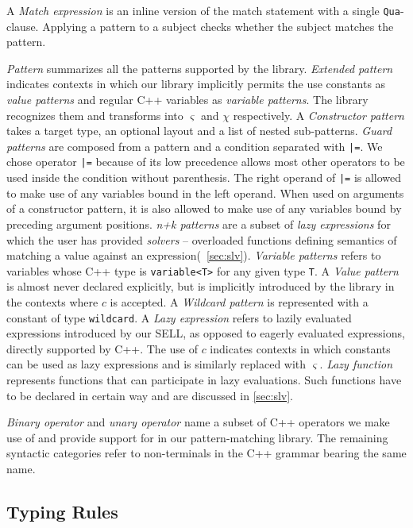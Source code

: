 \documentclass{llncs}
\makeatletter
\DeclareRobustCommand{\code}[1]{{\lstinline[keepspaces,breaklines=false,escapechar=@]{#1}}}
\makeatother
\begin{document}
A \emph{Match expression} is an inline version of the match statement with 
a single \code{Qua}-clause. Applying a pattern to a subject checks whether the 
subject matches the pattern.

\emph{Pattern} summarizes all the patterns supported by the library. 
\emph{Extended pattern} indicates contexts in which our library implicitly 
permits the use constants as \emph{value patterns} and regular C++ variables as 
\emph{variable patterns}. The library recognizes them and transforms into 
$\varsigma$ and $\chi$ respectively.
A \emph{Constructor pattern} takes a target type, an optional layout and a list of 
nested sub-patterns.
\emph{Guard patterns} are composed from a pattern and a condition separated with 
\code{|=}.
We chose operator \code{|=} because of its low precedence 
allows most other operators to be used inside the 
condition without parenthesis. The right operand of \code{|=} is allowed to make use of any 
variables bound in the left operand. When used on arguments of a constructor 
pattern, it is also allowed to make use of any variables bound by preceding 
argument positions. 
\emph{n+k patterns} are a subset of \emph{lazy expressions} for which the user has 
provided \emph{solvers} -- overloaded functions defining semantics of matching a 
value against an expression(\textsection~\ref{sec:slv}).
\emph{Variable patterns} refers to variables whose C++ type is \code{variable<T>} for 
any given type \code{T}.
A \emph{Value pattern} is almost never declared explicitly, 
but is implicitly introduced by the library in the contexts where $c$ is 
accepted.
A \emph{Wildcard pattern} is represented with a constant of type 
\code{wildcard}.
A \emph{Lazy expression} refers to lazily evaluated expressions introduced by our SELL, 
as opposed to eagerly evaluated expressions, directly supported by C++. The use 
of $c$ indicates contexts in which constants can be used as lazy expressions and 
is similarly replaced with $\varsigma$. \emph{Lazy function} represents 
functions that can participate in lazy evaluations. Such functions have to be 
declared in certain way and are discussed in \textsection\ref{sec:slv}. 

\emph{Binary operator} and \emph{unary operator} name a subset of C++ operators we 
make use of and provide support for in our pattern-matching library. 
The remaining syntactic categories refer to non-terminals in the C++ grammar 
bearing the same name.

\subsection{Typing Rules}
\end{document}
